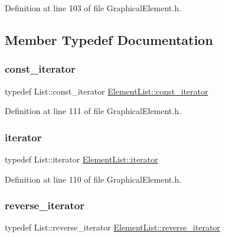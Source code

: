 Definition at line 103 of file Graphical\+Element.\+h.



\subsection{Member Typedef Documentation}
\mbox{\label{class_element_list_a4323074a8e979322c0bf1eed5c892cf4}} 
\subsubsection{\texorpdfstring{const\+\_\+iterator}{const\_iterator}}
{\footnotesize\ttfamily typedef List\+::const\+\_\+iterator \hyperlink{class_element_list_a4323074a8e979322c0bf1eed5c892cf4}{Element\+List\+::const\+\_\+iterator}}



Definition at line 111 of file Graphical\+Element.\+h.

\mbox{\label{class_element_list_a10e1b0c17ebe441fcd035fcf0a00d25e}} 
\subsubsection{\texorpdfstring{iterator}{iterator}}
{\footnotesize\ttfamily typedef List\+::iterator \hyperlink{class_element_list_a10e1b0c17ebe441fcd035fcf0a00d25e}{Element\+List\+::iterator}}



Definition at line 110 of file Graphical\+Element.\+h.

\mbox{\label{class_element_list_a5a94d1e25a0deeb3f222dc12fa115174}} 
\subsubsection{\texorpdfstring{reverse\+\_\+iterator}{reverse\_iterator}}
{\footnotesize\ttfamily typedef List\+::reverse\+\_\+iterator \hyperlink{class_element_list_a5a94d1e25a0deeb3f222dc12fa115174}{Element\+List\+::reverse\+\_\+iterator}}



